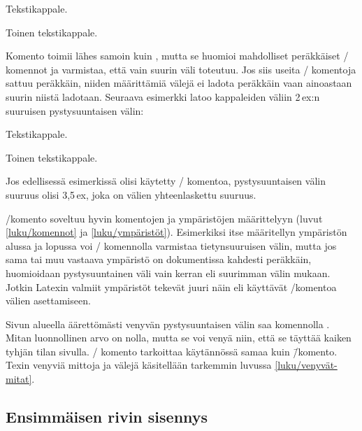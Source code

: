 \begin{koodilohkosis}
Tekstikappale.
\vspace{5ex plus 1ex minus .5ex}

Toinen tekstikappale.
\end{koodilohkosis}

\noindent
Komento  toimii lähes samoin kuin ,
mutta se huomioi mahdolliset peräkkäiset \-/ komennot
ja varmistaa, että vain suurin väli toteutuu. Jos siis useita
\-/ komentoja sattuu peräkkäin, niiden määrittämiä
välejä ei ladota peräkkäin vaan ainoastaan suurin niistä ladotaan.
Seuraava esimerkki latoo kappaleiden väliin 2\,ex:n suuruisen
pystysuuntaisen välin:

\begin{koodilohkosis}
Tekstikappale.

\addvspace{1ex} \addvspace{2ex} \addvspace{.5ex}
Toinen tekstikappale.
\end{koodilohkosis}

\noindent
Jos edellisessä esimerkissä olisi käytetty \-/ komentoa,
pystysuuntaisen välin suuruus olisi 3,5\,ex, joka on välien
yhteenlaskettu suuruus.

\-/komento soveltuu hyvin komentojen ja ympäristöjen
määrittelyyn (luvut \ref{luku/komennot} ja \ref{luku/ympäristöt}).
Esimerkiksi itse määritellyn ympäristön alussa ja lopussa voi
\-/ komennolla varmistaa tietynsuuruisen välin, mutta
jos sama tai muu vastaava ympäristö on dokumentissa kahdesti peräkkäin,
huomioidaan pystysuuntainen väli vain kerran eli suurimman välin mukaan.
Jotkin Latexin valmiit ympäristöt tekevät juuri näin eli käyttävät
\-/komentoa välien asettamiseen.

Sivun alueella äärettömästi venyvän pystysuuntaisen välin saa komennolla
. Mitan luonnollinen arvo on nolla, mutta se voi venyä
niin, että se täyttää kaiken tyhjän tilan sivulla. \-/
komento tarkoittaa käytännössä samaa kuin
 \=/komento. Texin venyviä
mittoja ja välejä käsitellään tarkemmin luvussa
\ref{luku/venyvät-mitat}.

\subsection{Ensimmäisen rivin sisennys}
\label{luku/ensimmäisen-rivin-sisennys}

